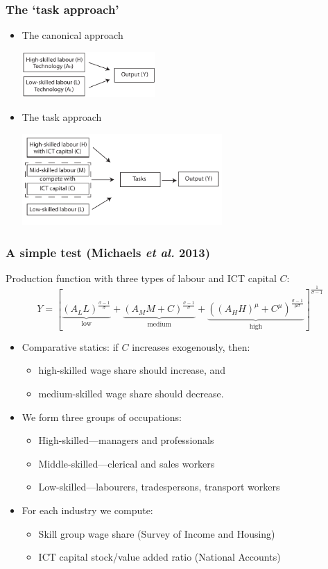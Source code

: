 \documentclass[red]{beamer}
\newcommand{\vitem}{\vfill\item}
\begin{document}
\begin{frame}[c]
\frametitle{The `task approach'}
\begin{itemize}
\item The canonical approach\\
\begin{center}
\includegraphics[width=2in]{slides_fig/CES.pdf}
\end{center}
\pause
\item The task approach\\
\begin{center}
\includegraphics[width=3in]{slides_fig/CES_tasks.pdf}
\end{center}
\end{itemize}
\end{frame}

\begin{frame}[c]
  \frametitle{A simple test (Michaels {\em et al.} 2013)}
Production function with three types of labour and ICT capital $C$:
$$
Y = \left[
  \underbrace{(A_LL)^\frac{\sigma-1}{\sigma}}_{\text{low}}
  +
  \underbrace{(A_MM + C)^\frac{\sigma-1}{\sigma}}_{\text{medium}}
  +
  \underbrace{((A_HH)^\mu + C^\mu)^\frac{\sigma-1}{\mu\sigma}}_{\text{high}}
  \right]^\frac{1}{\sigma-1}
$$
\pause
  \begin{itemize}
  \item Comparative statics: if $C$ increases exogenously, then: 
  \begin{itemize}
  \item high-skilled wage share should increase, and 
  \item medium-skilled wage share should decrease.
  \end{itemize}
  \pause
  \vitem We form three groups of occupations:
  \begin{itemize}
  \item High-skilled---managers and professionals
  \item Middle-skilled---clerical and sales workers
  \item Low-skilled---labourers, tradespersons, transport workers
  \end{itemize}
  \pause
  \vitem For each industry we compute:
  \begin{itemize}
  \item Skill group wage share (Survey of Income and Housing)
  \item ICT capital stock/value added ratio (National Accounts)
  \end{itemize}
\end{itemize}
\end{frame}
\end{document}
